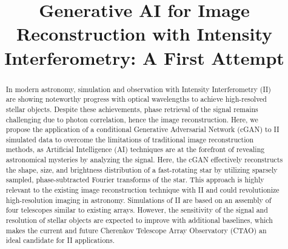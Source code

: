 \documentclass[fleqn,usenatbib,twocolumn]{mnras}
\title{Generative AI for Image Reconstruction with Intensity Interferometry: A First Attempt}
\date{}
\begin{document}
\maketitle

\begin{abstract}
In modern astronomy, simulation and observation with Intensity Interferometry (II) are showing noteworthy progress with optical wavelengths to achieve high-resolved stellar objects. Despite these achievements, phase retrieval of the signal remains challenging due to photon correlation, hence the image reconstruction. Here, we propose the application of a conditional Generative Adversarial Network (cGAN) to II simulated data to overcome the limitations of traditional image reconstruction methods, as Artificial Intelligence (AI) techniques are at the forefront of revealing astronomical mysteries by analyzing the signal. Here, the cGAN effectively reconstructs the shape, size, and brightness distribution of a fast-rotating star by utilizing sparsely sampled, phase-subtracted Fourier transforms of the star. This approach is highly relevant to the existing image reconstruction technique with II and could revolutionize high-resolution imaging in astronomy. Simulations of II are based on an assembly of four telescopes similar to existing arrays. However, the sensitivity of the signal and resolution of stellar objects are expected to improve with additional baselines, which makes the current and future Cherenkov Telescope Array Observatory (CTAO) an ideal candidate for II applications.
\end{abstract}









\end{document}
